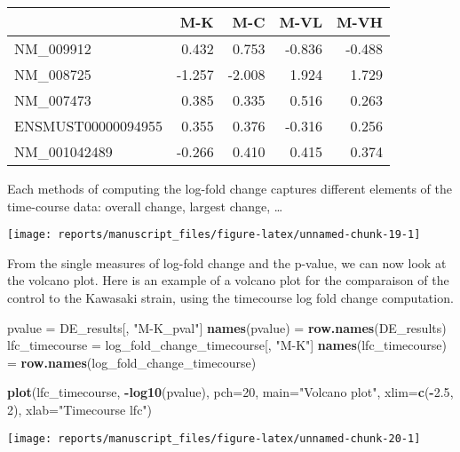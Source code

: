 \documentclass[9pt,a4paper,]{extarticle}
\newenvironment{Shaded}{\begin{snugshade}}{\end{snugshade}}
\newcommand{\DataTypeTok}[1]{\textcolor[rgb]{0.13,0.29,0.53}{#1}}
\newcommand{\DecValTok}[1]{\textcolor[rgb]{0.00,0.00,0.81}{#1}}
\newcommand{\FloatTok}[1]{\textcolor[rgb]{0.00,0.00,0.81}{#1}}
\newcommand{\KeywordTok}[1]{\textcolor[rgb]{0.13,0.29,0.53}{\textbf{#1}}}
\newcommand{\NormalTok}[1]{#1}
\newcommand{\OperatorTok}[1]{\textcolor[rgb]{0.81,0.36,0.00}{\textbf{#1}}}
\newcommand{\StringTok}[1]{\textcolor[rgb]{0.31,0.60,0.02}{#1}}
\begin{document}
\begin{tabular}{lrrrr}
\toprule
  & M-K & M-C & M-VL & M-VH\\
\midrule
NM\_009912 & 0.432 & 0.753 & -0.836 & -0.488\\
NM\_008725 & -1.257 & -2.008 & 1.924 & 1.729\\
NM\_007473 & 0.385 & 0.335 & 0.516 & 0.263\\
ENSMUST00000094955 & 0.355 & 0.376 & -0.316 & 0.256\\
NM\_001042489 & -0.266 & 0.410 & 0.415 & 0.374\\
\bottomrule
\end{tabular}

Each methods of computing the log-fold change captures different elements of
the time-course data: overall change, largest change, \ldots{}

\begin{center}\texttt{[image: reports/manuscript\_files/figure-latex/unnamed-chunk-19-1]} \end{center}

From the single measures of log-fold change and the p-value, we can now look
at the volcano plot. Here is an example of a volcano plot for the comparaison
of the control to the Kawasaki strain, using the timecourse log fold change
computation.

\begin{Shaded}
\begin{Highlighting}[]
\NormalTok{pvalue =}\StringTok{ }\NormalTok{DE_results[, }\StringTok{"M-K_pval"}\NormalTok{]}
\KeywordTok{names}\NormalTok{(pvalue) =}\StringTok{ }\KeywordTok{row.names}\NormalTok{(DE_results)}
\NormalTok{lfc_timecourse =}\StringTok{ }\NormalTok{log_fold_change_timecourse[, }\StringTok{"M-K"}\NormalTok{]}
\KeywordTok{names}\NormalTok{(lfc_timecourse) =}\StringTok{ }\KeywordTok{row.names}\NormalTok{(log_fold_change_timecourse)}

\KeywordTok{plot}\NormalTok{(lfc_timecourse, }\OperatorTok{-}\KeywordTok{log10}\NormalTok{(pvalue), }\DataTypeTok{pch=}\DecValTok{20}\NormalTok{, }\DataTypeTok{main=}\StringTok{"Volcano plot"}\NormalTok{,}
     \DataTypeTok{xlim=}\KeywordTok{c}\NormalTok{(}\OperatorTok{-}\FloatTok{2.5}\NormalTok{, }\DecValTok{2}\NormalTok{), }\DataTypeTok{xlab=}\StringTok{"Timecourse lfc"}\NormalTok{)}
\end{Highlighting}
\end{Shaded}

\begin{center}\texttt{[image: reports/manuscript\_files/figure-latex/unnamed-chunk-20-1]} \end{center}
\end{document}
